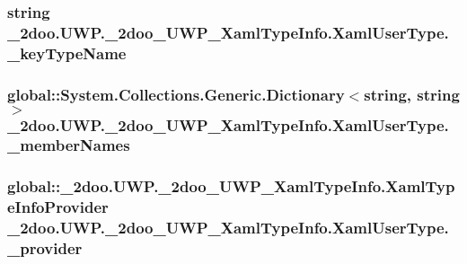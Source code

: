 \hypertarget{class__2doo_1_1_u_w_p_1_1__2doo___u_w_p___xaml_type_info_1_1_xaml_user_type_e96600f43af95d89dab6ccb224d34a58}{
\subsubsection[{\_\-keyTypeName}]{\setlength{\rightskip}{0pt plus 5cm}string {\bf \_\-2doo.UWP.\_\-2doo\_\-UWP\_\-XamlTypeInfo.XamlUserType.\_\-keyTypeName}}}
\label{class__2doo_1_1_u_w_p_1_1__2doo___u_w_p___xaml_type_info_1_1_xaml_user_type_e96600f43af95d89dab6ccb224d34a58}


\hypertarget{class__2doo_1_1_u_w_p_1_1__2doo___u_w_p___xaml_type_info_1_1_xaml_user_type_40389957430b9267ba3ceea32542bec0}{
\subsubsection[{\_\-memberNames}]{\setlength{\rightskip}{0pt plus 5cm}global::System.Collections.Generic.Dictionary$<$string, string$>$ {\bf \_\-2doo.UWP.\_\-2doo\_\-UWP\_\-XamlTypeInfo.XamlUserType.\_\-memberNames}}}
\label{class__2doo_1_1_u_w_p_1_1__2doo___u_w_p___xaml_type_info_1_1_xaml_user_type_40389957430b9267ba3ceea32542bec0}


\hypertarget{class__2doo_1_1_u_w_p_1_1__2doo___u_w_p___xaml_type_info_1_1_xaml_user_type_6811ea912da9da65cae5d9742dcdec21}{
\subsubsection[{\_\-provider}]{\setlength{\rightskip}{0pt plus 5cm}global::\_\-2doo.UWP.\_\-2doo\_\-UWP\_\-XamlTypeInfo.XamlTypeInfoProvider {\bf \_\-2doo.UWP.\_\-2doo\_\-UWP\_\-XamlTypeInfo.XamlUserType.\_\-provider}}}
\label{class__2doo_1_1_u_w_p_1_1__2doo___u_w_p___xaml_type_info_1_1_xaml_user_type_6811ea912da9da65cae5d9742dcdec21}




